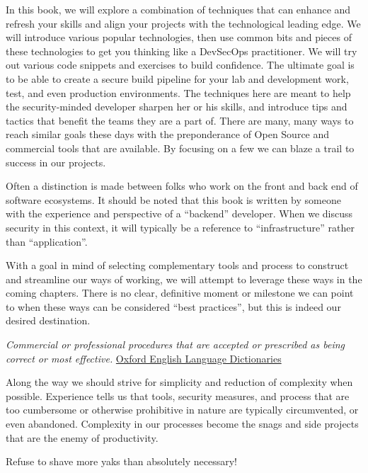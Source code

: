 \justifying
In this book, we will explore a combination of techniques that can enhance and refresh
your skills and align your projects with the technological leading edge. We will
introduce various popular technologies, then use common bits and pieces of
these technologies to get you thinking like a DevSecOps practitioner. We will try out
various code snippets and exercises to build confidence. The ultimate goal is to be able to
create a secure build pipeline for your lab and development work,
test, and even production environments. The techniques here are meant to help
the security-minded developer sharpen her or his skills, and introduce tips
and tactics that benefit the teams they are a part of. There are many, many
ways to reach similar goals these days with the preponderance of Open Source
and commercial tools that are available. By focusing on a few we can blaze a
trail to success in our projects.

\justifying
Often a distinction is made between folks
who work on the front and back end of software ecosystems. It should be noted that this
book is written by someone with the
experience and perspective of a ``backend'' developer. When we discuss security in this context,
it will typically be a reference to ``infrastructure'' rather than ``application''.

\justifying
With a goal in mind of selecting complementary tools and process to construct
and streamline our ways of working, we will attempt to leverage these ways in the coming chapters.
There is no clear, definitive moment or milestone we can point to when these ways can be considered
``best practices'', but this is indeed our desired destination.

\begin{displayquote}
\emph{Commercial or professional procedures that are accepted or prescribed as being correct or most effective.}
\href{https://www.oxfordlearnersdictionaries.com/definition/american_english/best-practice}{Oxford English Language Dictionaries}
\end{displayquote}


Along the way we should strive for simplicity and reduction of complexity when possible.
Experience tells us that tools, security measures, and process that are too cumbersome
or otherwise prohibitive in nature are typically circumvented, or even abandoned.
Complexity in our processes become the snags and side projects that are the
enemy of productivity.

\justifying
Refuse to shave more yaks\cite{yak}
 than absolutely necessary!
